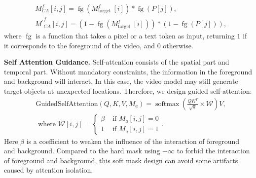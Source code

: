 %
\begin{equation}
\begin{aligned}
& M_{C A}^f[i, j] =\operatorname{fg}\left(M_{\text {target }}^f[i]\right) * \operatorname{fg}(P[j]), \\
& {M^{\prime}}_{C A}^f[i, j] =\left(1-\operatorname{fg}\left(M_{\text {target }}^f[i]\right)\right) * (1-\operatorname{fg}(P[j])),
\end{aligned}
\end{equation}
%
where $\operatorname{fg}$ is a function that takes a pixel or a text token as input, returning $1$ if it corresponds to the foreground of the video, and $0$ otherwise.

\noindent\textbf{Self Attention Guidance.} Self-attention consists of the spatial part and temporal part. Without mandatory constraints, the information in the foreground and background will interact. In this case, the video model may still generate target objects at unexpected locations. Therefore, we design guided self-attention:
%
\begin{equation}
\begin{aligned}
& \text {GuidedSelfAttention}(Q, K, V, M_a)=\operatorname{softmax}\left(\frac{Q K^T}{\sqrt{d}}\times \mathcal{W}\right) V, \\
& \text { where } \mathcal{W}[i, j]= \begin{cases}\beta & \text { if } M_a[i, j]=0 \\
1 & \text { if } M_a[i, j]=1\end{cases}.
\end{aligned}
\label{eq:sata}
\end{equation}
Here $\beta$ is a coefficient to weaken the influence of the interaction of foreground and background. Compared to the hard mask using $-\infty$ to forbid the interaction of foreground and background, this soft mask design can avoid some artifacts caused by attention isolation. 

